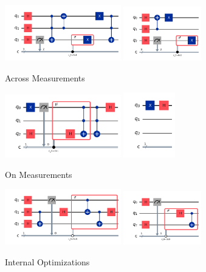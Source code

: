 \documentclass[10pt]{article}
\begin{document}
\begin{figure}[h]
\centering
  \includegraphics[width=0.45\textwidth]{Images/meas_1.png}
  \includegraphics[width=0.30\textwidth]{Images/meas_2.png}
  \caption{Across Measurements}
  \label{fig:meas_12}
\end{figure}

\begin{figure}[h]
\centering
  \includegraphics[width=0.45\textwidth]{Images/meas_3.png}
  \includegraphics[width=0.20\textwidth]{Images/meas_4.png}
  \caption{On Measurements}
  \label{fig:meas_34}
\end{figure}

\begin{figure}[h]
\centering
  \includegraphics[width=0.45\textwidth]{Images/val_dep_1.png}
  \includegraphics[width=0.30\textwidth]{Images/val_dep_2.png}
  \caption{Internal Optimizations}
  \label{fig:val_dep}
\end{figure}
\end{document}

